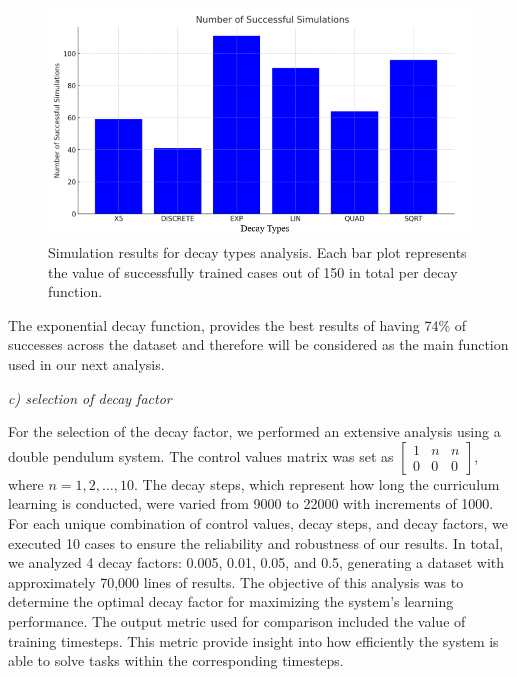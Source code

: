 \begin{figure}[h]
	\centering
	\includegraphics[width=12cm]{Figures/decay_types_results_comparison.png}
	\caption{Simulation results for decay types analysis. Each bar plot represents the value of successfully trained cases out of 150 in total per decay function.}
	\label{fig: decay types comparison}
\end{figure}

The exponential decay function, provides the best results of having 74\% of successes across the dataset and therefore will be considered as the main function used in our next analysis. 

\textit{c) selection of decay factor}

For the selection of the decay factor, we performed an extensive analysis using a double pendulum system. The control values matrix was set as \(\begin{bmatrix} 1 & n & n \\ 0 & 0 & 0 \end{bmatrix}\), where \(n = 1, 2, \ldots, 10\). The decay steps, which represent how long the curriculum learning is conducted, were varied from 9000 to 22000 with increments of 1000. For each unique combination of control values, decay steps, and decay factors, we executed 10 cases to ensure the reliability and robustness of our results. In total, we analyzed 4 decay factors: 0.005, 0.01, 0.05, and 0.5, generating a dataset with approximately 70,000 lines of results. The objective of this analysis was to determine the optimal decay factor for maximizing the system's learning performance.
The output metric used for comparison included the value of training timesteps. This metric provide insight into how efficiently the system is able to solve tasks within the corresponding timesteps.

